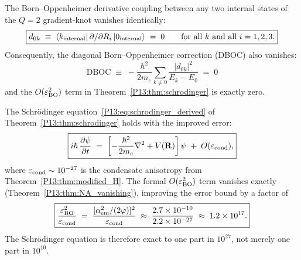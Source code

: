 \begin{theorem}
\label{P13:thm:NA_vanishing}
The Born--Oppenheimer derivative coupling between any two internal states
of the $Q=2$ gradient-knot vanishes identically:
\begin{equation}
  \boxed{d_{0k} \;\equiv\; \langle k_{\rm internal}|\,\partial/\partial R_i\,|0_{\rm internal}\rangle
  \;=\; 0
  \qquad \text{for all } k \text{ and all } i=1,2,3.}
  \label{P13:eq:d0k_zero}
\end{equation}
Consequently, the diagonal Born--Oppenheimer correction (DBOC) also vanishes:
\begin{equation}
  \mathrm{DBOC}
  \;\equiv\; -\frac{\hbar^2}{2m_e}\sum_{k\neq0}\frac{|d_{0k}|^2}{E_k-E_0}
  \;=\; 0
  \label{P13:eq:DBOC_zero}
\end{equation}
and the $O(\varepsilon_{\rm BO}^2)$ term in Theorem~\ref{P13:thm:schrodinger}
is exactly zero.
\end{theorem}

\begin{corollary}
\label{P13:cor:improved_BO}
The Schr\"odinger equation~\eqref{P13:eq:schrodinger_derived} of
Theorem~\ref{P13:thm:schrodinger} holds with the improved error:
\begin{equation}
  \boxed{i\hbar\,\frac{\partial\psi}{\partial t}
  \;=\;
  \left[-\frac{\hbar^2}{2m_e}\nabla^2 + V(\mathbf{R})\right]\psi
  \;+\; O(\varepsilon_{\rm cond}),}
  \label{P13:eq:schrodinger_improved}
\end{equation}
where $\varepsilon_{\rm cond}\sim10^{-27}$ is the condensate anisotropy
from Theorem~\ref{P13:thm:modified_H}.
The formal $O(\varepsilon_{\rm BO}^2)$ term vanishes exactly
(Theorem~\ref{P13:thm:NA_vanishing}), improving the error bound by
a factor of
\begin{equation}
  \boxed{\frac{\varepsilon_{\rm BO}^2}{\varepsilon_{\rm cond}}
  \;=\; \frac{[\alpha_{\mathrm{em}}^2/(2\varphi)]^2}{\varepsilon_{\rm cond}}
  \;\approx\; \frac{2.7\times10^{-10}}{2.2\times10^{-27}}
  \;\approx\; 1.2\times10^{17}.}
  \label{P13:eq:improvement_factor}
\end{equation}
The Schr\"odinger equation is therefore exact to one part in $10^{27}$,
not merely one part in $10^{10}$.
\end{corollary}

